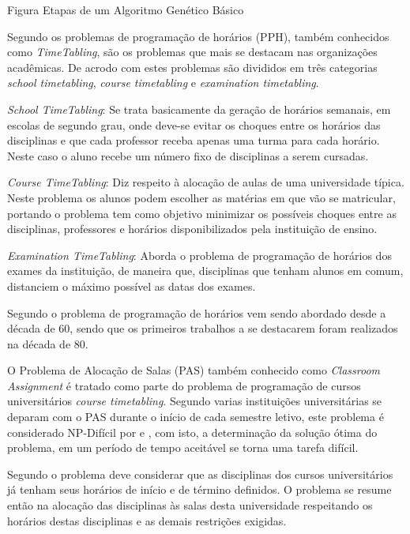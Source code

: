 Figura Etapas de um Algoritmo Genético Básico 


Segundo \cite{kripkasimulated} os problemas de programação de horários (PPH), também conhecidos como \textit{TimeTabling}, são os problemas que mais se destacam nas organizações acadêmicas. De acrodo com \cite{schaerf1999survey} estes problemas são divididos em três categorias \textit{school timetabling}, \textit{course timetabling} e \textit{examination timetabling}.\par

\textit{School TimeTabling}: Se trata basicamente da geração de horários semanais, em escolas de segundo grau, onde deve-se evitar os choques entre os horários das disciplinas e que cada professor receba apenas uma turma para cada horário. Neste caso o aluno recebe um número fixo de disciplinas a serem cursadas.\par

\textit{Course TimeTabling}: Diz respeito à alocação de aulas de uma universidade típica. Neste problema os alunos podem escolher as matérias em que vão se matricular, portando o problema tem como objetivo minimizar os possíveis choques entre as disciplinas, professores e horários disponibilizados pela instituição de ensino.\par

\textit{Examination TimeTabling}: Aborda o problema de programação de horários dos exames da instituição, de maneira que, disciplinas que tenham alunos em comum, distanciem o máximo possível as datas dos exames.\par

Segundo \cite{pinheiro2001ambiente} o problema de programação de horários vem sendo abordado desde a década de 60, sendo que os primeiros trabalhos a se destacarem foram realizados na década de 80.\par

O Problema de Alocação de Salas (PAS) também conhecido como \textit{Classroom Assignment} é tratado como parte do problema de programação de cursos universitários \textit{course timetabling}. Segundo \cite{marinho2005heuristicas} varias instituições universitárias se deparam com o PAS durante o início de cada semestre letivo, este problema é considerado NP-Difícil por \cite{even1975complexity} e \cite{carter1992classroom}, com isto, a determinação da solução ótima do problema, em um período de tempo aceitável se torna uma tarefa difícil.\par
Segundo \cite{kripkasimulated} o problema deve considerar que as disciplinas dos cursos universitários já tenham seus horários de início e de término definidos. O problema se resume então na alocação das disciplinas às salas desta universidade respeitando os horários destas disciplinas e as demais restrições exigidas.

